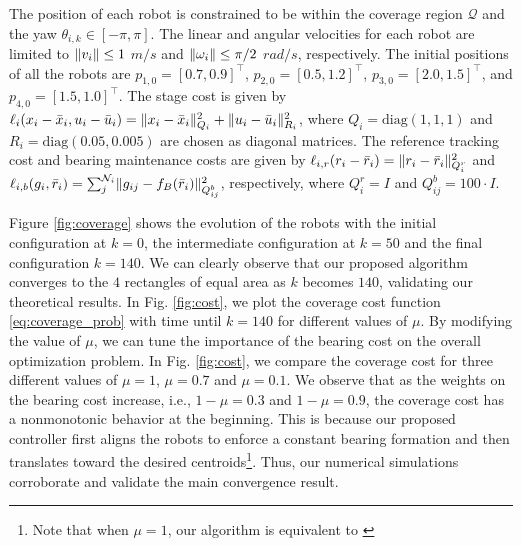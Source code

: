 The position of each robot is constrained to be within the coverage region $\mathcal{Q}$ and the yaw $\theta_{i,k} \in [-\pi, \pi]$. The linear and angular velocities for each robot are limited to $\lVert v_{i}\rVert\leq 1$ $m/s$ and $\lVert\omega_{i}\rVert\leq \pi/2$ $rad/s$, respectively. The initial positions of all the robots are $p_{1,0} = [0.7,0.9]^\top$, $p_{2,0} = [0.5,1.2]^\top$, $p_{3,0} = [2.0,1.5]^\top$, and $p_{4,0} = [1.5, 1.0]^\top$. The stage cost is given by $\ell_i(x_i-\bar{x}_i,u_i - \bar{u}_i) = \lVert x_i - \bar{x}_i\rVert^2_{Q_i} + \lVert u_i - \bar{u}_i\rVert^2_{R_i}$, where $Q_i = \text{diag}(1,1,1)$ and $R_i= \text{diag}(0.05, 0.005)$ are chosen as diagonal matrices. The reference tracking cost and bearing maintenance costs are given by $\ell_{i,r}(r_i-\bar{r}_i) = \lVert r_i - \bar{r}_i\rVert^2_{Q^r_i}$ and $\ell_{i,b}(g_i, \bar{r}_i) = \sum_j^{\mathcal{N}_i} \lVert g_{ij} - f_B(\bar{r}_i)\rVert^2_{Q^b_{ij}}$, respectively, where $Q^r_i = I$ and $Q^b_{ij} = 100\cdot I$. 

Figure \ref{fig:coverage} shows the evolution of the robots with the initial configuration at $k = 0$, the intermediate configuration at $k=50$ and the final configuration $k=140$. We can clearly observe that our proposed algorithm converges to the $4$ rectangles of equal area as $k$ becomes $140$, validating our theoretical results. In Fig. \ref{fig:cost}, we plot the coverage cost function \eqref{eq:coverage_prob} with time until $k =140$ for different values of $\mu$. By modifying the value of $\mu$, we can tune the importance of the bearing cost on the overall optimization problem. In Fig. \ref{fig:cost}, we compare the coverage cost for three different values of $\mu=1$, $\mu = 0.7$ and $\mu = 0.1$. We observe that as the weights on the bearing cost increase, i.e., $1 - \mu = 0.3$ and $1 - \mu = 0.9$, the coverage cost has a nonmonotonic behavior at the beginning. This is because our proposed controller first aligns the robots to enforce a constant bearing formation and then translates toward the desired centroids\footnote{Note that when $\mu=1$, our algorithm is equivalent to \cite{carron2020model}}. Thus, our numerical simulations corroborate and validate the main convergence result.

